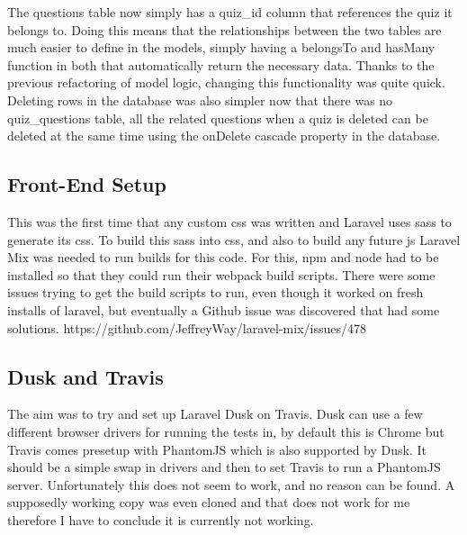 \documentclass{article}
\begin{document}
The questions table now simply has a quiz\_id column that references the quiz it belongs to. Doing this means that the relationships between the two tables are much easier to define in the models, simply having a belongsTo and hasMany function in both that automatically return the necessary data. Thanks to the previous refactoring of model logic, changing this functionality was quite quick. Deleting rows in the database was also simpler now that there was no quiz\_questions table, all the related questions when a quiz is deleted can be deleted at the same time using the onDelete cascade property in the database.
\subsection{Front-End Setup}
This was the first time that any custom css was written and Laravel uses sass to generate its css. To build this sass into css, and also to build any future js Laravel Mix was needed to run builds for this code. For this, npm and node had to be installed so that they could run their webpack build scripts. There were some issues trying to get the build scripts to run, even though it worked on fresh installs of laravel, but eventually a Github issue was discovered that had some solutions.
https://github.com/JeffreyWay/laravel-mix/issues/478
\subsection{Dusk and Travis}
The aim was to try and set up Laravel Dusk on Travis. Dusk can use a few different browser drivers for running the tests in, by default this is Chrome but Travis comes presetup with PhantomJS which is also supported by Dusk. It should be a simple swap in drivers and then to set Travis to run a PhantomJS server. Unfortunately this does not seem to work, and no reason can be found. A supposedly working copy was even cloned and that does not work for me therefore I have to conclude it is currently not working.

%
%
\end{document}
